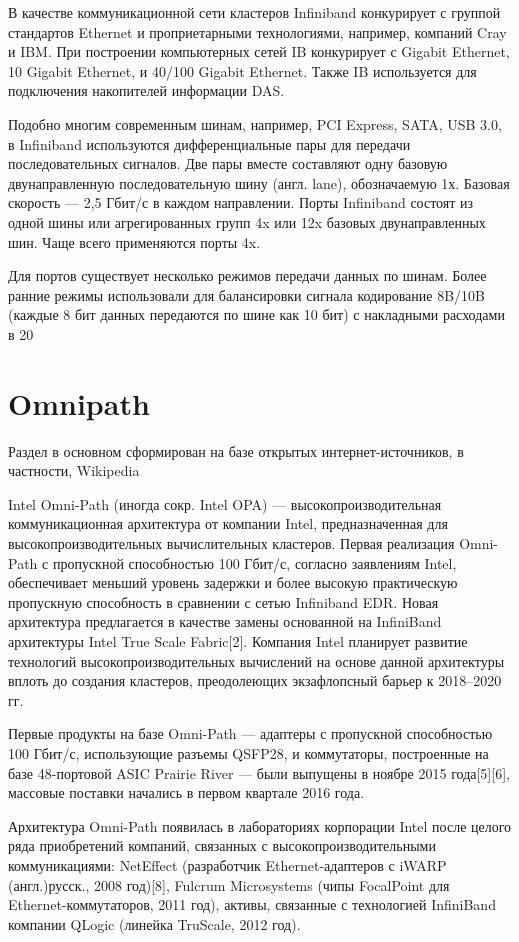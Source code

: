 В качестве коммуникационной сети кластеров Infiniband конкурирует с группой стандартов Ethernet и проприетарными технологиями, например, компаний Cray и IBM. При построении компьютерных сетей IB конкурирует с Gigabit Ethernet, 10 Gigabit Ethernet, и 40/100 Gigabit Ethernet. Также IB используется для подключения накопителей информации DAS. 

Подобно многим современным шинам, например, PCI Express, SATA, USB 3.0, в Infiniband используются дифференциальные пары для передачи последовательных сигналов. Две пары вместе составляют одну базовую двунаправленную последовательную шину (англ. lane), обозначаемую 1х. Базовая скорость — 2,5 Гбит/с в каждом направлении. Порты Infiniband состоят из одной шины или агрегированных групп 4x или 12x базовых двунаправленных шин. Чаще всего применяются порты 4x.

Для портов существует несколько режимов передачи данных по шинам. Более ранние режимы использовали для балансировки сигнала кодирование 8B/10B (каждые 8 бит данных передаются по шине как 10 бит) с накладными расходами в 20 %






\section{Omnipath}
Раздел в основном сформирован на базе открытых интернет-источников, в частности, Wikipedia 

Intel Omni-Path (иногда сокр. Intel OPA) — высокопроизводительная коммуникационная архитектура от компании Intel, предназначенная для высокопроизводительных вычислительных кластеров. Первая реализация Omni-Path с пропускной способностью 100 Гбит/с, согласно заявлениям Intel, обеспечивает меньший уровень задержки и более высокую практическую пропускную способность в сравнении с сетью Infiniband EDR. Новая архитектура предлагается в качестве замены основанной на InfiniBand архитектуры Intel True Scale Fabric[2]. Компания Intel планирует развитие технологий высокопроизводительных вычислений на основе данной архитектуры вплоть до создания кластеров, преодолеющих экзафлопсный барьер к 2018–2020 гг.

Первые продукты на базе Omni-Path — адаптеры с пропускной способностью 100 Гбит/с, использующие разъемы QSFP28, и коммутаторы, построенные на базе 48-портовой ASIC Prairie River — были выпущены в ноябре 2015 года[5][6], массовые поставки начались в первом квартале 2016 года.

Архитектура Omni-Path появилась в лабораториях корпорации Intel после целого ряда приобретений компаний, связанных с высокопроизводительными коммуникациями: NetEffect (разработчик Ethernet-адаптеров с iWARP (англ.)русск., 2008 год)[8], Fulcrum Microsystems (чипы FocalPoint для Ethernet-коммутаторов, 2011 год), активы, связанные с технологией InfiniBand компании QLogic (линейка TruScale, 2012 год).


    



